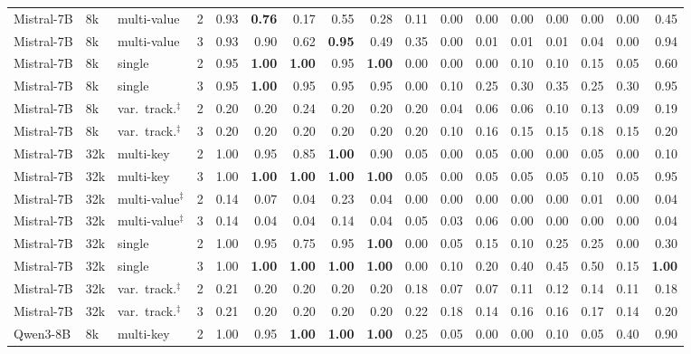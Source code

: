 \begin{tabular}{@{}llllrrrrrrrrrrrrr@{}}
Mistral-7B & 8k & multi-value & 2 & 0.93 & \textbf{0.76} & 0.17 & 0.55 & 0.28 & 0.11 & 0.00 & 0.00 & 0.00 & 0.00 & 0.00 & 0.00 & 0.45 \\
Mistral-7B & 8k & multi-value & 3 & 0.93 & 0.90 & 0.62 & \textbf{0.95} & 0.49 & 0.35 & 0.00 & 0.01 & 0.01 & 0.01 & 0.04 & 0.00 & 0.94 \\
Mistral-7B & 8k & single & 2 & 0.95 & \textbf{1.00} & \textbf{1.00} & 0.95 & \textbf{1.00} & 0.00 & 0.00 & 0.00 & 0.10 & 0.10 & 0.15 & 0.05 & 0.60 \\
Mistral-7B & 8k & single & 3 & 0.95 & \textbf{1.00} & 0.95 & 0.95 & 0.95 & 0.00 & 0.10 & 0.25 & 0.30 & 0.35 & 0.25 & 0.30 & 0.95 \\
Mistral-7B & 8k & var.\ track.$^\ddagger$ & 2 & 0.20 & 0.20 & 0.24 & 0.20 & 0.20 & 0.20 & 0.04 & 0.06 & 0.06 & 0.10 & 0.13 & 0.09 & 0.19 \\
Mistral-7B & 8k & var.\ track.$^\ddagger$ & 3 & 0.20 & 0.20 & 0.20 & 0.20 & 0.20 & 0.20 & 0.10 & 0.16 & 0.15 & 0.15 & 0.18 & 0.15 & 0.20 \\
\addlinespace[1pt]
Mistral-7B & 32k & multi-key & 2 & 1.00 & 0.95 & 0.85 & \textbf{1.00} & 0.90 & 0.05 & 0.00 & 0.05 & 0.00 & 0.00 & 0.05 & 0.00 & 0.10 \\
Mistral-7B & 32k & multi-key & 3 & 1.00 & \textbf{1.00} & \textbf{1.00} & \textbf{1.00} & \textbf{1.00} & 0.05 & 0.00 & 0.05 & 0.05 & 0.05 & 0.10 & 0.05 & 0.95 \\
Mistral-7B & 32k & multi-value$^\ddagger$ & 2 & 0.14 & 0.07 & 0.04 & 0.23 & 0.04 & 0.00 & 0.00 & 0.00 & 0.00 & 0.00 & 0.01 & 0.00 & 0.04 \\
Mistral-7B & 32k & multi-value$^\ddagger$ & 3 & 0.14 & 0.04 & 0.04 & 0.14 & 0.04 & 0.05 & 0.03 & 0.06 & 0.00 & 0.00 & 0.00 & 0.00 & 0.04 \\
Mistral-7B & 32k & single & 2 & 1.00 & 0.95 & 0.75 & 0.95 & \textbf{1.00} & 0.00 & 0.05 & 0.15 & 0.10 & 0.25 & 0.25 & 0.00 & 0.30 \\
Mistral-7B & 32k & single & 3 & 1.00 & \textbf{1.00} & \textbf{1.00} & \textbf{1.00} & \textbf{1.00} & 0.00 & 0.10 & 0.20 & 0.40 & 0.45 & 0.50 & 0.15 & \textbf{1.00} \\
Mistral-7B & 32k & var.\ track.$^\ddagger$ & 2 & 0.21 & 0.20 & 0.20 & 0.20 & 0.20 & 0.18 & 0.07 & 0.07 & 0.11 & 0.12 & 0.14 & 0.11 & 0.18 \\
Mistral-7B & 32k & var.\ track.$^\ddagger$ & 3 & 0.21 & 0.20 & 0.20 & 0.20 & 0.20 & 0.22 & 0.18 & 0.14 & 0.16 & 0.16 & 0.17 & 0.14 & 0.20 \\
\addlinespace[1pt]
Qwen3-8B & 8k & multi-key & 2 & 1.00 & 0.95 & \textbf{1.00} & \textbf{1.00} & \textbf{1.00} & 0.25 & 0.05 & 0.00 & 0.00 & 0.10 & 0.05 & 0.40 & 0.90 \\

\end{tabular}
